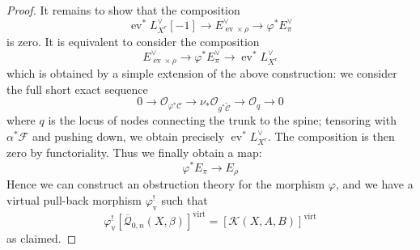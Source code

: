 \documentclass[11pt]{amsart}
\newcommand{\Q}[4]{\overline{\mathcal Q}_{#1,#2}(#3,#4)}
\newcommand{\OO}{\mathcal{O}}
\renewcommand{\to}{\rightarrow}
\newcommand{\virt}[1]{[#1]^{\operatorname{virt}}}
\newcommand{\ev}{\operatorname{ev}}
\theoremstyle{plain}
\theoremstyle{definition}
\begin{document}
\begin{proof}
It remains to show that the composition
\begin{equation*} \ev^*L_{X^r}^\vee [-1] \to E_{\ev \times \rho}^\vee \to \varphi^* E_\pi^\vee \end{equation*}
is zero. It is equivalent to consider the composition
\begin{equation*}  E_{\ev \times \rho}^\vee \to \varphi^* E_\pi^\vee \to \ev^*L_{X^r}^\vee \end{equation*}
which is obtained by a simple extension of the above construction: we consider the full short exact sequence
\begin{equation*} 0 \to \OO_{\varphi^* \mathcal{C}} \to \nu_* \OO_{g^* \tilde{\mathcal{C}}} \to \OO_q \to 0 \end{equation*}
where $q$ is the locus of nodes connecting the trunk to the spine; tensoring with $\alpha^* \mathcal{F}$ and pushing down, we obtain precisely $\ev^* L_{X^r}^\vee$. The composition is then zero by functoriality. Thus we finally obtain a map:
\begin{equation*} \varphi^* E_\pi \to E_\rho \end{equation*}
Hence we can construct an obstruction theory for the morphism $\varphi$, and we have a virtual pull-back morphism $\varphi^!_{\text{v}}$ such that
\begin{equation*} \varphi^!_{\text{v}} \virt{\Q{0}{n}{X}{\beta}} = \virt{\mathcal{K}(X,A,B)} \end{equation*}
as claimed. \end{proof}
\end{document}
